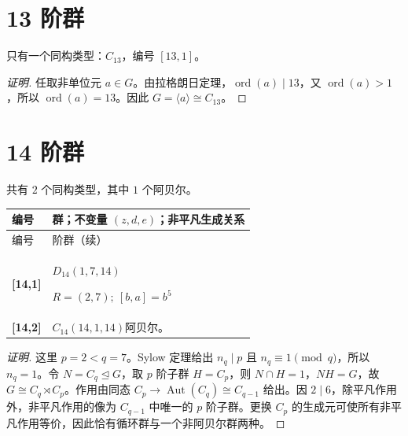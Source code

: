 \documentclass[UTF8,fontset=fandol,11pt,a4paper]{ctexart}
\newcommand{\Aut}{\operatorname{Aut}}\newcommand{\GL}{\operatorname{GL}}\newcommand{\ord}{\operatorname{ord}}\newcommand{\Z}{\mathrm Z}
\begin{document}
\section*{13 阶群}\label{order:13}

只有一个同构类型：$C_{13}$，编号 $[13,1]$。

\begin{proof}[证明]
任取非单位元 $a\in G$。由拉格朗日定理，$\ord(a)\mid 13$，又 $\ord(a)>1$，所以 $\ord(a)=13$。因此 $G=\langle a\rangle\cong C_{13}$。
\end{proof}

\section*{14 阶群}\label{order:14}

共有 $2$ 个同构类型，其中 $1$ 个阿贝尔。

\begingroup\small\setlength{\tabcolsep}{3pt}\renewcommand{\arraystretch}{1.12}

\begin{longtable}{@{}p{17mm}>{\raggedright\arraybackslash}p{141mm}@{}}

\toprule 编号 & 群；不变量 $(z,d,e)$；非平凡生成关系\\\midrule\endfirsthead

\toprule 编号 & 14 阶群（续）\\\midrule\endhead\bottomrule\endfoot

\textbf{[14,1]} & $D_{14}$\quad $(1,7,14)$\par\(R=(2,7);\allowbreak\ [b,a]=b^{5}\)\\[3pt]

\textbf{[14,2]} & $C_{14}$\quad $(14,1,14)$\quad 阿贝尔。\\[3pt]

\end{longtable}\endgroup

\begin{proof}[证明]
这里 $p=2<q=7$。Sylow 定理给出 $n_q\mid p$ 且 $n_q\equiv1\pmod q$，所以 $n_q=1$。令 $N=C_q\trianglelefteq G$，取 $p$ 阶子群 $H=C_p$，则 $N\cap H=1$，$NH=G$，故 $G\cong C_q\rtimes C_p$。作用由同态 $C_p\to\Aut(C_q)\cong C_{q-1}$ 给出。因 $2\mid 6$，除平凡作用外，非平凡作用的像为 $C_{q-1}$ 中唯一的 $p$ 阶子群。更换 $C_p$ 的生成元可使所有非平凡作用等价，因此恰有循环群与一个非阿贝尔群两种。
\end{proof}
\end{document}

